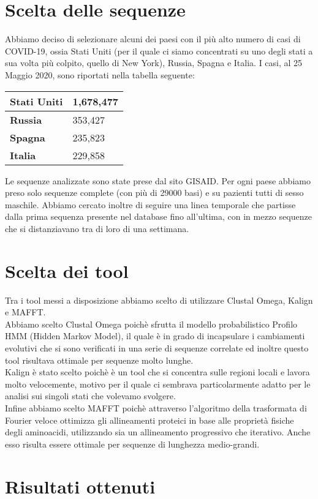 \documentclass[a4paper,10pt]{article}
\begin{document}
\section*{Scelta delle sequenze}
Abbiamo deciso di selezionare alcuni dei paesi con il più alto numero di casi di COVID-19, ossia Stati Uniti (per il quale ci siamo concentrati su uno degli stati a sua volta più colpito, quello di New York), Russia,  Spagna e Italia. I casi, al 25 Maggio 2020, sono riportati nella tabella seguente:

\begin{table}[H]
\centering
\begin{tabular}{|l|l|}
\hline
\textbf{Stati Uniti} & 1,678,477 \\ \hline
\textbf{Russia}      & 353,427   \\ \hline
\textbf{Spagna}      & 235,823   \\ \hline
\textbf{Italia}      & 229,858   \\ \hline
\end{tabular}
\end{table}

Le sequenze analizzate sono state prese dal sito GISAID. Per ogni paese abbiamo preso solo sequenze complete (con più di 29000 basi) e su pazienti tutti di sesso maschile. Abbiamo cercato inoltre di seguire una linea temporale che partisse dalla prima sequenza presente nel database fino all'ultima, con in mezzo sequenze che si distanziavano tra di loro di una settimana.

\section*{Scelta dei tool}
Tra i tool messi a disposizione abbiamo scelto di utilizzare Clustal Omega, Kalign e MAFFT.\\
Abbiamo scelto Clustal Omega poichè sfrutta il modello probabilistico Profilo HMM (Hidden Markov Model), il quale è in grado di incapsulare i cambiamenti evolutivi che si sono verificati in una serie di sequenze correlate ed inoltre questo tool risultava ottimale per sequenze molto lunghe.\\
Kalign è stato scelto poichè è un tool che si concentra sulle regioni locali e lavora molto velocemente, motivo per il quale ci sembrava particolarmente adatto per le analisi sui singoli stati che volevamo svolgere.\\
Infine abbiamo scelto MAFFT poichè attraverso l'algoritmo della trasformata di Fourier veloce ottimizza gli allineamenti proteici in base alle proprietà fisiche degli aminoacidi, utilizzando sia un allineamento progressivo che iterativo. Anche esso risulta essere ottimale per sequenze di lunghezza medio-grandi. %


\section*{Risultati ottenuti}

\end{document}
